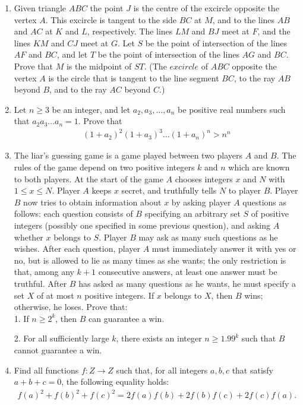 \documentclass{article}
\begin{document}
\begin{enumerate}
\item Given triangle $ABC$ the point $J$ is the centre of the excircle opposite the vertex $A$. This excircle is tangent to the side $BC$ at $M$, and to the lines $AB$ and $AC$ at $K$ and $L$, respectively. The lines $LM$ and $BJ$ meet at $F$, and the lines $KM$ and $CJ$ meet at $G$. Let $S$ be the point of intersection of the lines $AF$ and $BC$, and let $T$ be the point of intersection of the lines $AG$ and $BC$. Prove that $M$ is the midpoint of $ST$.
(The $excircle$ of $ABC$ opposite the vertex $A$ is the circle that is tangent to the line segment $BC$, to the ray $AB$ beyond $B$, and to the ray $AC$ beyond $C$.)
\item  Let $n\geq{3}$ be an integer, and let $a_{2}, a_{3},\dots, a_{n}$  be positive real numbers such that $a_{2}a_{3} \dots a_{n} = 1$. Prove that
	\begin{align}
		(1+a_{2}) ^{2}  (1+a_{3}) ^{3} \dots (1+a_{n}) ^{n} > n^{n}
	\end{align}
	
\item The liar's guessing game is a game played between two players $A$ and $B$. The rules of the game depend on two positive integers $k$ and $n$ which are known to both players. At the start of the game $A$ chooses integers $x$ and $N$ with $1\leq{x}\leq{N}$. Player $A$ keeps $x$ secret, and truthfully tells $N$ to player $B$. Player $B$ now tries to obtain information about $x$ by asking player $A$ questions as follows: each question consists of $B$ specifying an arbitrary set $S$ of positive integers (possibly one specified in some previous question), and asking $A$ whether $x$ belongs to $S$. Player $B$ may ask as many such questions as he wishes. After each question, player $A$ must immediately answer it with yes or no, but is allowed to lie as many times as she wants; the only restriction is that, among any $k + 1$ consecutive answers, at least one answer must be truthful.
	After $B$ has asked as many questions as he wants, he must specify a set $X$ of at most $n$ positive integers. If $x$ belongs to $X$, then $B$ wins; otherwise, he loses. Prove that: \\
1. If $n\geq{2^{k}}$, then $B$ can guarantee a win.

		2. For all sufficiently large $k$, there exists an integer $n\geq{1.99^{k}}$ such that $B$ cannot guarantee a win.
	\item Find all functions $f:Z \rightarrow Z $  such that, for all integers $a, b, c$ that satisfy $a+b+c = 0$, the following equality holds:
		\begin{align}
			f ( a)^2+f(b)^2+f(c)^2=2f ( a)f (b)+2f ( b) f  (c)+2f ( c) f  (a).
		\end{align}
		

\end{enumerate}
\end{document}
